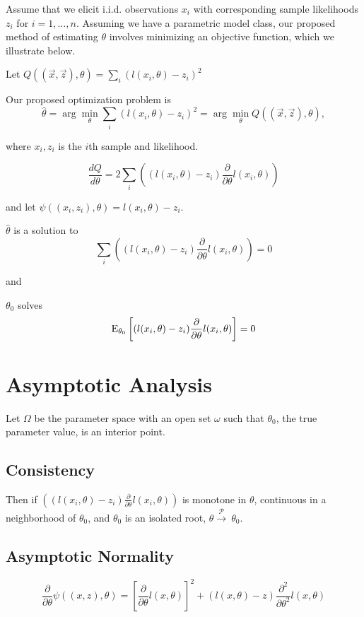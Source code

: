 Assume that we elicit i.i.d. observations $x_i$ with corresponding sample likelihoods $z_i$ for $i=1,\ldots,n$. Assuming we have a parametric model class, our proposed method of estimating $\theta$ involves minimizing an objective function, which we illustrate below.

Let $Q((\vec{x},\vec{z}),\theta)=\sum_i \left( l(x_i,\theta)-z_i \right)^2$

Our proposed optimization problem is $$
\hat{\theta} = \arg \min_{\theta} \sum_i \left( l(x_i,\theta)-z_i \right)^2 = \arg \min_{\theta} Q((\vec{x},\vec{z}), \theta),$$

where $x_i,z_i$ is the $i$th sample and likelihood.

$$\frac{dQ}{d\theta} = 2 \sum_i \left( (l(x_i,\theta)-z_i) \frac{\partial}{\partial \theta}l(x_i,\theta)\right) $$

and let $\psi((x_i,z_i),\theta)=l(x_i,\theta)-z_i.$

$\hat{\theta}$ is a solution to $$\sum_i \left( (l(x_i,\theta)-z_i) \frac{\partial}{\partial \theta}l(x_i,\theta)\right) = 0$$

and

$\theta_0$ solves $$\mathrm{E}_{\theta_0}\left[(l(x_i,\theta)-z_i) \frac{\partial}{\partial \theta}l(x_i,\theta)\right]=0$$

\section*{Asymptotic Analysis}

Let $\Omega$ be the parameter space with an open set $\omega$ such that $\theta_0$, the true parameter value, is an interior point.

\subsection*{Consistency}

Then if $\left( (l(x_i,\theta)-z_i) \frac{\partial}{\partial \theta}l(x_i,\theta)\right)$ is monotone in $\theta$, continuous in a neighborhood of $\theta_0$, and $\theta_0$ is an isolated root, $\hat{\theta} \xrightarrow{\mathcal{P}}\ \theta_0$.

\subsection*{Asymptotic Normality}

$$\frac{\partial}{\partial \theta} \psi((x,z),\theta) = \left[ \frac{\partial}{\partial \theta}l(x,\theta) \right]^2  + (l(x,\theta)-z) \frac{\partial^2}{\partial \theta^2}l(x,\theta)$$


